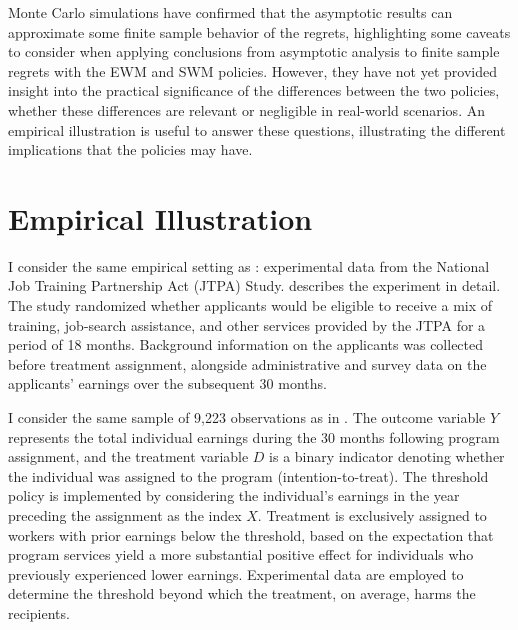 {Monte Carlo simulations have confirmed that the asymptotic results can approximate some finite sample behavior of the regrets, highlighting some caveats to consider when applying conclusions from asymptotic analysis to finite sample regrets with the EWM and SWM policies. However, they have not yet provided insight into the practical significance of the differences between the two policies, whether these differences are relevant or negligible in real-world scenarios. An empirical illustration is useful to answer these questions, illustrating the different implications that the policies may have.

\section{Empirical Illustration} \label{sec:empirical}

I consider the same empirical setting as \cite{kitagawa2018should}: experimental data from the National Job Training Partnership Act (JTPA) Study. \cite{bloom1997benefits} describes the experiment in detail. The study randomized whether applicants would be eligible to receive a mix of training, job-search assistance, and other services provided by the JTPA for a period of 18 months. Background information on the applicants was collected before treatment assignment, alongside administrative and survey data on the applicants' earnings over the subsequent 30 months.

I consider the same sample of 9,223 observations as in \cite{kitagawa2018should}. The outcome variable $Y$ represents the total individual earnings during the 30 months following program assignment, and the treatment variable $D$ is a binary indicator denoting whether the individual was assigned to the program (intention-to-treat). The threshold policy is implemented by considering the individual's earnings in the year preceding the assignment as the index $X$. Treatment is exclusively assigned to workers with prior earnings below the threshold, based on the expectation that program services yield a more substantial positive effect for individuals who previously experienced lower earnings. Experimental data are employed to determine the threshold beyond which the treatment, on average, harms the recipients.

}
